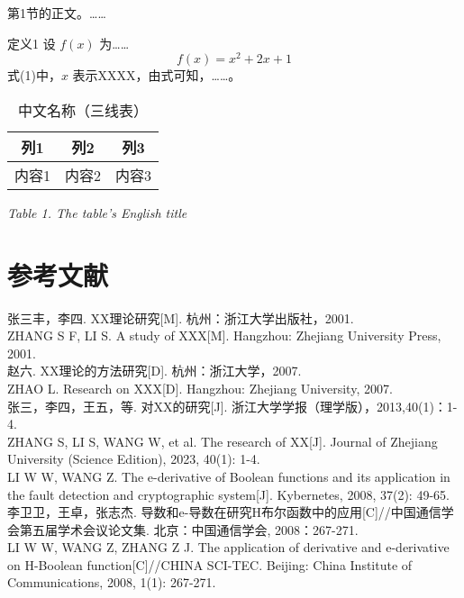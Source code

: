 \documentclass[UTF8, 12pt]{ctexart}
\begin{document}
第1节的正文。……

定义1 设 \( f(x) \) 为……
\[ f(x) = x^2 + 2x + 1 \]
式(1)中，\( x \) 表示XXXX，由式可知，……。

\begin{table}[H]
  \centering
  \caption{中文名称（三线表）}
  \label{tab:table1}
  \begin{tabular}{ccc}
    \toprule
    列1 & 列2 & 列3 \\
    \midrule
    内容1 & 内容2 & 内容3 \\
    \bottomrule
  \end{tabular}
  \small{\textit{Table 1. The table’s English title}}
\end{table}

\section{参考文献}
张三丰，李四. XX理论研究[M]. 杭州：浙江大学出版社，2001. \\
ZHANG S F, LI S. A study of XXX[M]. Hangzhou: Zhejiang University Press, 2001. \\
赵六. XX理论的方法研究[D]. 杭州：浙江大学，2007. \\
ZHAO L. Research on XXX[D]. Hangzhou: Zhejiang University, 2007. \\
张三，李四，王五，等. 对XX的研究[J]. 浙江大学学报（理学版），2013,40(1)：1-4. \\
ZHANG S, LI S, WANG W, et al. The research of XX[J]. Journal of Zhejiang University (Science Edition), 2023, 40(1): 1-4. \\
LI W W, WANG Z. The e-derivative of Boolean functions and its application in the fault detection and cryptographic system[J]. Kybernetes, 2008, 37(2): 49-65. \\
李卫卫，王卓，张志杰. 导数和e-导数在研究H布尔函数中的应用[C]//中国通信学会第五届学术会议论文集. 北京：中国通信学会, 2008：267-271. \\
LI W W, WANG Z, ZHANG Z J. The application of derivative and e-derivative on H-Boolean function[C]//CHINA SCI-TEC. Beijing: China Institute of Communications, 2008, 1(1): 267-271.
\end{document}
